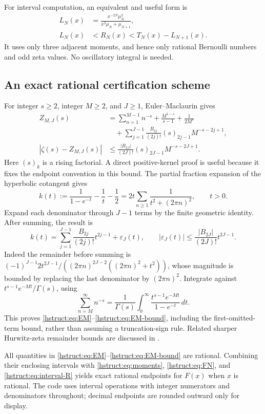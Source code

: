 For interval computation, an equivalent and useful form is
\begin{align}
 L_N(x)&=\frac{x^{-2N}\mu_N^2}{x^2\mu_N+\mu_{N+1}},\nonumber\\
 L_N(x)&<R_N(x)<T_N(x)-L_{N+1}(x).
 \label{hstruct:eq:interval-R}
\end{align}
It uses only three adjacent moments, and hence only rational
Bernoulli numbers and odd zeta values. No oscillatory integral is needed.

\subsection{An exact rational certification scheme}

For integer $s\ge2$, integer $M\ge2$, and $J\ge1$, Euler--Maclaurin
gives
\begin{align}
 Z_{M,J}(s)
 &=\sum_{n=1}^{M-1}n^{-s}
   +\frac{M^{1-s}}{s-1}+\frac1{2M^s}\nonumber\\
 &\quad+\sum_{j=1}^{J-1}
 \frac{B_{2j}}{(2j)!}(s)_{2j-1}M^{-s-2j+1},\label{hstruct:eq:EM}\\
 |\zeta(s)-Z_{M,J}(s)|
 &\le
 \frac{|B_{2J}|}{(2J)!}(s)_{2J-1}M^{-s-2J+1}.
 \label{hstruct:eq:EM-bound}
\end{align}
Here $(s)_k$ is a rising factorial. A direct positive-kernel proof
is useful because it fixes the endpoint convention in this bound.
The partial fraction expansion of the hyperbolic cotangent gives
\[
 k(t):=\frac1{1-e^{-t}}-\frac1t-\frac12
       =2t\sum_{n\ge1}\frac1{t^2+(2\pi n)^2},\qquad t>0.
\]
Expand each denominator through $J-1$ terms by the finite geometric
identity. After summing, the result is
\[
 k(t)=\sum_{j=1}^{J-1}\frac{B_{2j}}{(2j)!}t^{2j-1}
           +\varepsilon_J(t),\qquad
 |\varepsilon_J(t)|
 \le\frac{|B_{2J}|}{(2J)!}t^{2J-1}.
\]
Indeed the remainder before summing is
$(-1)^{J-1}2t^{2J-1}/
((2\pi n)^{2J-2}((2\pi n)^2+t^2))$, whose magnitude is bounded
by replacing the last denominator by $(2\pi n)^2$.
Integrate against $t^{s-1}e^{-Mt}/\Gamma(s)$, using
\[
 \sum_{n=M}^\infty n^{-s}
 =\frac1{\Gamma(s)}
       \int_0^\infty\frac{t^{s-1}e^{-Mt}}{1-e^{-t}}\,dt.
\]
This proves \eqref{hstruct:eq:EM}--\eqref{hstruct:eq:EM-bound}, including the
first-omitted-term bound, rather than assuming a truncation-sign rule.
Related sharper Hurwitz-zeta remainder bounds are discussed in
\cite{hstruct:Nemes}.

All quantities in \eqref{hstruct:eq:EM}--\eqref{hstruct:eq:EM-bound} are rational.
Combining their enclosing intervals with
\eqref{hstruct:eq:moments}, \eqref{hstruct:eq:FN}, and \eqref{hstruct:eq:interval-R} yields
exact rational endpoints for $F(x)$ when $x$ is rational.
The code uses interval operations with integer numerators and
denominators throughout; decimal endpoints are rounded outward only
for display.


